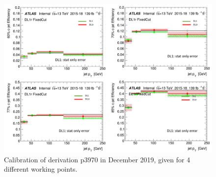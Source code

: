 \documentclass[letterpaper,12pt]{article}
\begin{document}
\begin{figure}
\includegraphics[width=1\textwidth]{Dec_eff.png}
\caption{Calibration of derivation p3970 in December 2019, given for  4 different working points.}\label{fig:Dec_eff}
\end{figure}
\end{document}
